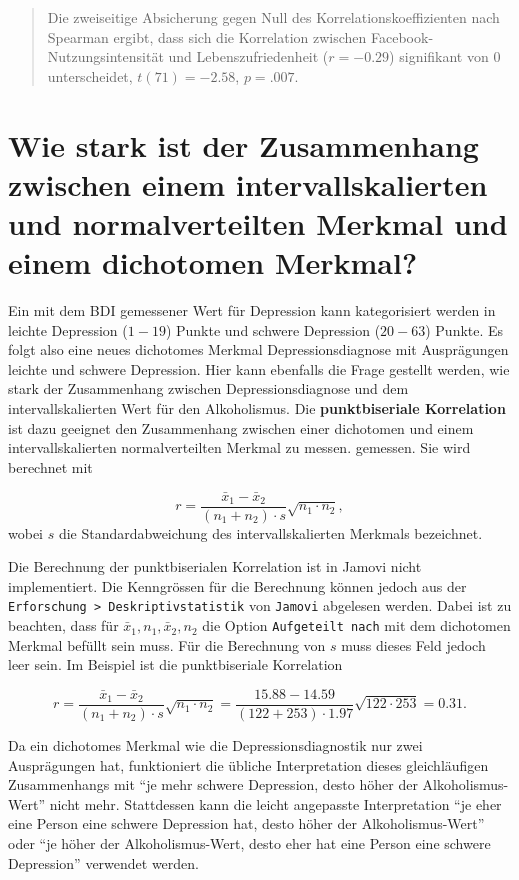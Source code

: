 \documentclass[
]{book}
\theoremstyle{definition}
\theoremstyle{definition}
\theoremstyle{definition}
\theoremstyle{definition}
\theoremstyle{remark}
\begin{document}
\begin{quote}
Die zweiseitige Absicherung gegen Null des Korrelationskoeffizienten nach Spearman ergibt, dass sich die Korrelation zwischen Facebook-Nutzungsintensität und Lebenszufriedenheit (\(r = -0.29\)) signifikant von \(0\) unterscheidet, \(t(71) = -2.58\), \(p = .007\).
\end{quote}

\section{Wie stark ist der Zusammenhang zwischen einem intervallskalierten und normalverteilten Merkmal und einem dichotomen Merkmal?}\label{wie-stark-ist-der-zusammenhang-zwischen-einem-intervallskalierten-und-normalverteilten-merkmal-und-einem-dichotomen-merkmal}

Ein mit dem BDI gemessener Wert für Depression kann kategorisiert werden in leichte Depression (\(1-19\)) Punkte und schwere Depression (\(20-63\)) Punkte. Es folgt also eine neues dichotomes Merkmal Depressionsdiagnose mit Ausprägungen leichte und schwere Depression. Hier kann ebenfalls die Frage gestellt werden, wie stark der Zusammenhang zwischen Depressionsdiagnose und dem intervallskalierten Wert für den Alkoholismus. \label{customdef-punktbiseriale-korrelation}{Die \textbf{punktbiseriale Korrelation} ist dazu geeignet den Zusammenhang zwischen einer dichotomen und einem intervallskalierten normalverteilten Merkmal zu messen.} gemessen. Sie wird berechnet mit

\[ r = \frac{\bar{x}_1- \bar{x}_2}{(n_1+n_2)\cdot s}\sqrt{n_1\cdot n_2},\]
wobei \(s\) die Standardabweichung des intervallskalierten Merkmals bezeichnet.

Die Berechnung der punktbiserialen Korrelation ist in Jamovi nicht implementiert. Die Kenngrössen für die Berechnung können jedoch aus der \texttt{Erforschung\ \textgreater{}\ Deskriptivstatistik} von \texttt{Jamovi} abgelesen werden. Dabei ist zu beachten, dass für \(\bar{x}_1, n_1, \bar{x}_2, n_2\) die Option \texttt{Aufgeteilt\ nach} mit dem dichotomen Merkmal befüllt sein muss. Für die Berechnung von \(s\) muss dieses Feld jedoch leer sein. Im Beispiel ist die punktbiseriale Korrelation

\[ r = \frac{\bar{x}_1- \bar{x}_2}{(n_1+n_2)\cdot s}\sqrt{n_1\cdot n_2}
= \frac{15.88- 14.59}{(122+253)\cdot 1.97}\sqrt{122\cdot 253} = 0.31.\]

Da ein dichotomes Merkmal wie die Depressionsdiagnostik nur zwei Ausprägungen hat, funktioniert die übliche Interpretation dieses gleichläufigen Zusammenhangs mit ``je mehr schwere Depression, desto höher der Alkoholismus-Wert'' nicht mehr. Stattdessen kann die leicht angepasste Interpretation ``je eher eine Person eine schwere Depression hat, desto höher der Alkoholismus-Wert'' oder ``je höher der Alkoholismus-Wert, desto eher hat eine Person eine schwere Depression'' verwendet werden.
\end{document}
